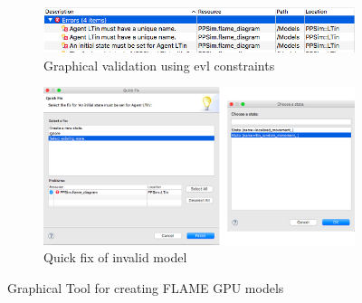 \documentclass{UoYCSproject}
\begin{document}
\begin{figure}[htp]\ContinuedFloat
\centering
\begin{subfigure}{\textwidth}
\centering
\includegraphics[width=\textwidth]{Appendix/validation_gmf}
\caption{Graphical validation using \gls{evl} constraints}
\label{fig:validation_gmf}
\end{subfigure}

\begin{subfigure}{\textwidth}
\centering
\includegraphics[width=\textwidth]{Appendix/validation_quickfix_gmf}
\caption{Quick fix of invalid model}
\label{fig:validation_quickfix_gmf}
\end{subfigure}%

\caption{Graphical Tool for creating \gls{FLAME GPU} models}
\label{fig:gmf}
\end{figure}
 
\end{document}
